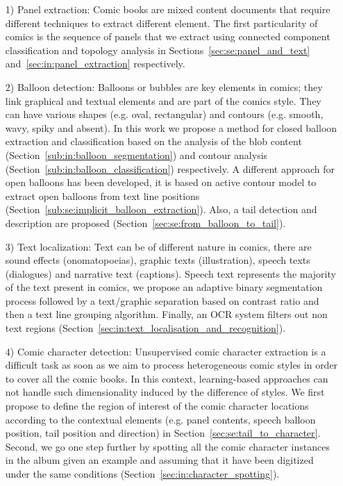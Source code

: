 \begin{itemize}
	
	\item [1)] Panel extraction: Comic books are mixed content documents that require different techniques to extract different element.
	The first particularity of comics is the sequence of panels that we extract using connected component classification and topology analysis in Sections~\ref{sec:se:panel_and_text} and~\ref{sec:in:panel_extraction} respectively.
	
	\item [2)] Balloon detection: Balloons or bubbles are key elements in comics; they link graphical and textual elements and are part of the comics style. They can have various shapes (e.g. oval, rectangular) and contours (e.g. smooth, wavy, spiky and absent).
	In this work we propose a method for closed balloon extraction and classification based on the analysis of the blob content (Section~\ref{sub:in:balloon_segmentation}) and contour analysis (Section~\ref{sub:in:balloon_classification}) respectively.
	A different approach for open balloons has been developed, it is based on active contour model to extract open balloons from text line positions (Section~\ref{sub:se:implicit_balloon_extraction}).
	Also, a tail detection and description are proposed (Section~\ref{sec:se:from_balloon_to_tail}).

	\item [3)] Text localization: Text can be of different nature in comics, there are sound effects (onomatopoeias), graphic texts (illustration), speech texts (dialogues) and narrative text (captions).
	Speech text represents the majority of the text present in comics, we propose an adaptive binary segmentation process followed by a text/graphic separation based on contrast ratio and then a text line grouping algorithm.
	Finally, an OCR system filters out non text regions (Section~\ref{sec:in:text_localisation_and_recognition}).

	
	\item [4)] Comic character detection: Unsupervised comic character extraction is a difficult task as soon as we aim to process heterogeneous comic styles in order to cover all the comic books.
	In this context, learning-based approaches can not handle such dimensionality induced by the difference of styles.
	We first propose to define the region of interest of the comic character locations according to the contextual elements (e.g. panel contents, speech balloon position, tail position and direction) in Section~\ref{sec:se:tail_to_character}.
	Second, we go one step further by spotting all the comic character instances in the album given an example and assuming that it have been digitized under the same conditions (Section~\ref{sec:in:character_spotting}).
	

\end{itemize}
